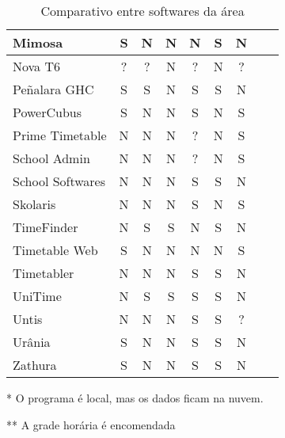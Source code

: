 \documentclass[12pt,a4paper]{article}
\begin{document}
\begin{table}[htb]
\begin{center}
{\begin{threeparttable}
\begin{tabular}{| l | c | c | c | c | c | c | c | c | }
							Mimosa				& S & N & N & N & S & N & \cite{rel_mimosa}								\\ \hline %
							Nova T6             & ? & ? & N & ? & N & ? & \cite{rel_novat6}								\\ \hline %
							Peñalara GHC		& S & S & N & S & S & N & \cite{rel_penalara}							\\ \hline %
							PowerCubus 	    	& S & N & N & S & N & S & \cite{rel_gridclass, rel_powercubus}			\\ \hline %
							Prime Timetable     & N & N & N & ? & N & S & \cite{rel_primetimetable}						\\ \hline %
							School Admin		& N & N & N & ? & N & S & \cite{rel_schooladmin}						\\ \hline %
							School Softwares    & N & N & N & S & S & N & \cite{rel_schoolsoftwares} 					\\ \hline %
							Skolaris			& N & N & N & S & N & S & \cite{rel_skolaris}							\\ \hline %
							TimeFinder          & N & S & S & N & S & N & \cite{rel_timefinder}							\\ \hline %
							Timetable Web 	    & S & N & N & N & N & S & \cite{rel_timetableweb} 						\\ \hline %
							Timetabler          & N & N & N & S & S & N & \cite{rel_timetabler} 						\\ \hline %
							UniTime  			& N & S & S & S & S & N & \cite{rel_unitime}  							\\ \hline %
							Untis 	 			& N & N & N & S & S & ? & \cite{rel_untis} 								\\ \hline %
							Urânia 		   	 	& S & N & N & S & S & N & \cite{rel_urania} 							\\ \hline %
							Zathura				& S & N & N & S & S & N & \cite{rel_zathura}							\\ \hline %
						\end{tabular}
						\caption{Comparativo entre softwares da área}
						\label{table:softwares}
						\footnotesize
						\begin{tablenotes}
							\item[*]{ O programa é local, mas os dados ficam na nuvem.}
							\item[**]{A grade horária é encomendada}
						\end{tablenotes}
					\end{threeparttable}
				}
			\end{center}
		\end{table}
\end{document}
